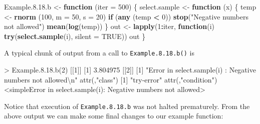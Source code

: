 \documentclass[
]{book}
\newenvironment{Shaded}{\begin{snugshade}}{\end{snugshade}}
\newcommand{\AttributeTok}[1]{\textcolor[rgb]{0.13,0.29,0.53}{#1}}
\newcommand{\ConstantTok}[1]{\textcolor[rgb]{0.56,0.35,0.01}{#1}}
\newcommand{\ControlFlowTok}[1]{\textcolor[rgb]{0.13,0.29,0.53}{\textbf{#1}}}
\newcommand{\DecValTok}[1]{\textcolor[rgb]{0.00,0.00,0.81}{#1}}
\newcommand{\FloatTok}[1]{\textcolor[rgb]{0.00,0.00,0.81}{#1}}
\newcommand{\FunctionTok}[1]{\textcolor[rgb]{0.13,0.29,0.53}{\textbf{#1}}}
\newcommand{\NormalTok}[1]{#1}
\newcommand{\OtherTok}[1]{\textcolor[rgb]{0.56,0.35,0.01}{#1}}
\newcommand{\SpecialCharTok}[1]{\textcolor[rgb]{0.81,0.36,0.00}{\textbf{#1}}}
\newcommand{\StringTok}[1]{\textcolor[rgb]{0.31,0.60,0.02}{#1}}
\begin{document}
\begin{Shaded}
\begin{Highlighting}[]
\NormalTok{Example.}\DecValTok{8}\NormalTok{.}\FloatTok{18.}\NormalTok{b }\OtherTok{\textless{}{-}} \ControlFlowTok{function}\NormalTok{ (}\AttributeTok{iter =} \DecValTok{500}\NormalTok{)}
\NormalTok{\{ select.sample }\OtherTok{\textless{}{-}} \ControlFlowTok{function}\NormalTok{ (x) }
\NormalTok{  \{ temp }\OtherTok{\textless{}{-}} \FunctionTok{rnorm}\NormalTok{ (}\DecValTok{100}\NormalTok{, }\AttributeTok{m =} \DecValTok{50}\NormalTok{, }\AttributeTok{s =} \DecValTok{20}\NormalTok{)}
    \ControlFlowTok{if}\NormalTok{ (}\FunctionTok{any}\NormalTok{ (temp }\SpecialCharTok{\textless{}} \DecValTok{0}\NormalTok{)) }\FunctionTok{stop}\NormalTok{(}\StringTok{"Negative numbers not allowed"}\NormalTok{)}
    \FunctionTok{mean}\NormalTok{(}\FunctionTok{log}\NormalTok{(temp))                                                         \}}
\NormalTok{  out }\OtherTok{\textless{}{-}} \FunctionTok{lapply}\NormalTok{(}\DecValTok{1}\SpecialCharTok{:}\NormalTok{iter, }\ControlFlowTok{function}\NormalTok{(i) }
                        \FunctionTok{try}\NormalTok{(}\FunctionTok{select.sample}\NormalTok{(i), }\AttributeTok{silent =} \ConstantTok{TRUE}\NormalTok{))}
\NormalTok{  out}
\NormalTok{\}}
\end{Highlighting}
\end{Shaded}

A typical chunk of output from a call to \texttt{Example.8.18.b()} is

\begin{Shaded}
\begin{Highlighting}[]
\NormalTok{\textgreater{} Example.8.18.b(2)}
\NormalTok{[[1]]}
\NormalTok{[1] 3.804975}
\NormalTok{[[2]]}
\NormalTok{[1] "Error in select.sample(i) : Negative numbers not allowed\textbackslash{}n"}
\NormalTok{attr(,"class")}
\NormalTok{[1] "try{-}error"}
\NormalTok{attr(,"condition")}
\NormalTok{\textless{}simpleError in select.sample(i): Negative numbers not allowed\textgreater{}}
\end{Highlighting}
\end{Shaded}

Notice that execution of \texttt{Example.8.18.b} was not halted prematurely. From the above output we can make some final changes to our example function:
\end{document}
